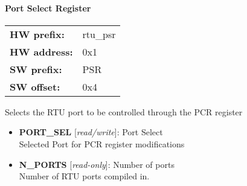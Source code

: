 \paragraph*{Port Select Register}\vspace{12pt}

\begin{tabular}{l l }
{\bf HW prefix:}  & rtu\_psr\\
{\bf HW address:}  & 0x1\\
{\bf SW prefix:}  & PSR\\
{\bf SW offset:}  & 0x4\\
\end{tabular}

\vspace{12pt}
Selects the RTU port to be controlled through the PCR register

\vspace{12pt}
\noindent
{}

\begin{itemize}
\item \begin{small}
{\bf 
PORT\_SEL
} [\emph{read/write}]: Port Select
\\
Selected Port for PCR register modifications
\end{small}
\item \begin{small}
{\bf 
N\_PORTS
} [\emph{read-only}]: Number of ports
\\
Number of RTU ports compiled in.
\end{small}
\end{itemize}
